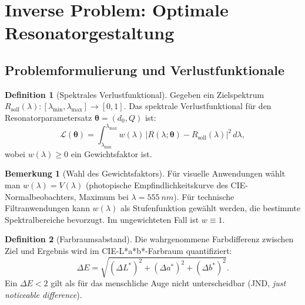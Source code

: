 ﻿\documentclass[a4paper,12pt]{article}
\theoremstyle{definition}
\newtheorem{definition}{Definition}[section]
\newtheorem{bemerkung}{Bemerkung}[section]
\newcommand{\vect}[1]{\bm{#1}}
\begin{document}
	\section{Inverse Problem: Optimale Resonatorgestaltung}
	\label{sec:invers}
	
	\subsection{Problemformulierung und Verlustfunktionale}
	
	\begin{definition}[Spektrales Verlustfunktional]
		\label{def:verlustfunktional}
		Gegeben ein Zielspektrum $R_\mathrm{soll}(\lambda): [\lambda_\mathrm{min}, \lambda_\mathrm{max}] \to [0,1]$.
		Das spektrale Verlustfunktional für den Resonatorparametersatz
		$\vect{\theta} = (d_0, Q)$ ist:
		\begin{equation}
			\mathcal{L}(\vect{\theta}) = \int_{\lambda_\mathrm{min}}^{\lambda_\mathrm{max}}
			w(\lambda)\,\bigl|R(\lambda; \vect{\theta}) - R_\mathrm{soll}(\lambda)\bigr|^2\, d\lambda,
			\label{eq:verlust}
		\end{equation}
		wobei $w(\lambda) \geq 0$ ein Gewichtsfaktor ist.
	\end{definition}
	
	\begin{bemerkung}[Wahl des Gewichtsfaktors]
		Für visuelle Anwendungen wählt man $w(\lambda) = V(\lambda)$
		(photopische Empfindlichkeitskurve des CIE-Normalbeobachters,
		Maximum bei $\lambda = \SI{555}{nm}$). Für technische Filtranwendungen
		kann $w(\lambda)$ als Stufenfunktion gewählt werden, die bestimmte
		Spektralbereiche bevorzugt. Im ungewichteten Fall ist $w \equiv 1$.
	\end{bemerkung}
	
	\begin{definition}[Farbraumsabstand]
		\label{def:farbraum}
		Die wahrgenommene Farbdifferenz zwischen Ziel und Ergebnis wird im
		CIE-L*a*b*-Farbraum quantifiziert:
		\begin{equation}
			\Delta E = \sqrt{(\Delta L^*)^2 + (\Delta a^*)^2 + (\Delta b^*)^2}.
			\label{eq:deltaE}
		\end{equation}
		Ein $\Delta E < 2$ gilt als für das menschliche Auge nicht unterscheidbar
		(JND, \textit{just noticeable difference}).
	\end{definition}
	
\end{document}
